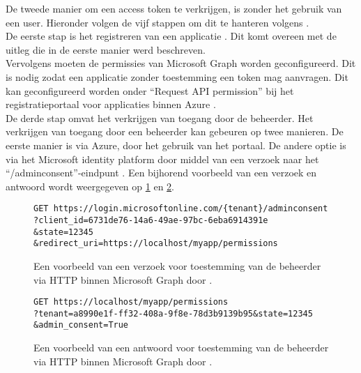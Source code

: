 De tweede manier om een access token te verkrijgen, is zonder het gebruik van een user. Hieronder volgen de vijf stappen om dit te hanteren volgens \textcite{Microsoft2023s}. \\

De eerste stap is het registreren van een applicatie \autocite{Microsoft2023s}. Dit komt overeen met de uitleg die in de eerste manier werd beschreven. \\

Vervolgens moeten de permissies van Microsoft Graph worden geconfigureerd. Dit is nodig zodat een applicatie zonder toestemming een token mag aanvragen. Dit kan geconfigureerd worden onder “Request \ac{API} permission” bij het registratieportaal voor applicaties binnen Azure \autocite{Microsoft2023s}. \\

De derde stap omvat het verkrijgen van toegang door de beheerder. Het verkrijgen van toegang door een beheerder kan gebeuren op twee manieren. De eerste manier is via Azure, door het gebruik van het portaal. De andere optie is via het Microsoft identity platform door middel van een verzoek naar het “/adminconsent”-eindpunt \autocite{Microsoft2023s}. Een bijhorend voorbeeld van een verzoek en antwoord wordt weergegeven op \ref{MSGRAR} en \ref{MSGRARES}. \\

\begin{figure}[!h]
    \scriptsize
    \begin{verbatim}
GET https://login.microsoftonline.com/{tenant}/adminconsent
?client_id=6731de76-14a6-49ae-97bc-6eba6914391e
&state=12345
&redirect_uri=https://localhost/myapp/permissions
    \end{verbatim}    
    \caption[Voorbeeld “/adminconsent” request Microsoft Graph]{Een voorbeeld van een verzoek voor toestemming van de beheerder via \ac{HTTP} binnen Microsoft Graph door \textcite{Microsoft2023s}.}
    \label{MSGRAR}
\end{figure}

\begin{figure}[!h]
    \scriptsize
    \begin{verbatim}
GET https://localhost/myapp/permissions
?tenant=a8990e1f-ff32-408a-9f8e-78d3b9139b95&state=12345
&admin_consent=True
    \end{verbatim}    
    \caption[Voorbeeld “/adminconsent” response Microsoft Graph]{Een voorbeeld van een antwoord voor toestemming van de beheerder via \ac{HTTP} binnen Microsoft Graph door \textcite{Microsoft2023s}.}
    \label{MSGRARES}
\end{figure}

